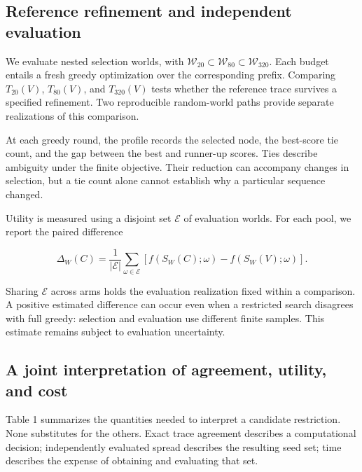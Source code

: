\documentclass[smallextended]{svjour3}
\begin{document}
\subsection{Reference refinement and independent evaluation}

We evaluate nested selection worlds, with \(\mathcal{W}_{20}\subset \mathcal{W}_{80}\subset \mathcal{W}_{320}\). Each budget entails a fresh greedy optimization over the corresponding prefix. Comparing \(T_{20}(V)\), \(T_{80}(V)\), and \(T_{320}(V)\) tests whether the reference trace survives a specified refinement. Two reproducible random-world paths provide separate realizations of this comparison.

At each greedy round, the profile records the selected node, the best-score tie count, and the gap between the best and runner-up scores. Ties describe ambiguity under the finite objective. Their reduction can accompany changes in selection, but a tie count alone cannot establish why a particular sequence changed.

Utility is measured using a disjoint set \(\mathcal{E}\) of evaluation worlds. For each pool, we report the paired difference

\begin{equation}
\Delta _{W}(C)=\frac{1}{|\mathcal{E}|}\sum _{\omega \in \mathcal{E}}[f(S_{W}(C);\omega )-f(S_{W}(V);\omega )].
\end{equation}

Sharing \(\mathcal{E}\) across arms holds the evaluation realization fixed within a comparison. A positive estimated difference can occur even when a restricted search disagrees with full greedy: selection and evaluation use different finite samples. This estimate remains subject to evaluation uncertainty.


\subsection{A joint interpretation of agreement, utility, and cost}

Table 1 summarizes the quantities needed to interpret a candidate restriction. None substitutes for the others. Exact trace agreement describes a computational decision; independently evaluated spread describes the resulting seed set; time describes the expense of obtaining and evaluating that set.
\end{document}
